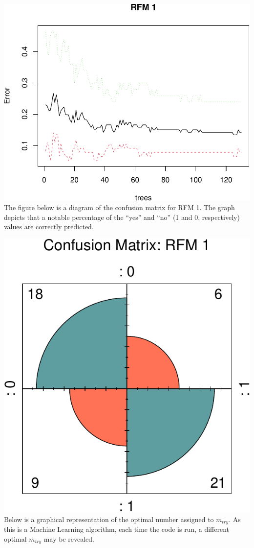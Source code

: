 \documentclass[11pt,preprint, authoryear]{elsarticle}
\numberwithin{equation}{section}
\numberwithin{figure}{section}
\numberwithin{table}{section}
\begin{document}
\includegraphics{ML_project_files/figure-latex/unnamed-chunk-7-1.pdf}
\newpage The figure below is a diagram of the confusion matrix for RFM
1. The graph depicts that a notable percentage of the ``yes'' and ``no''
(1 and 0, respectively) values are correctly predicted.

\includegraphics{ML_project_files/figure-latex/unnamed-chunk-8-1.pdf}
\newpage Below is a graphical representation of the optimal number
assigned to \(m_{try}\). As this is a Machine Learning algorithm, each
time the code is run, a different optimal \(m_{try}\) may be revealed.
\end{document}
